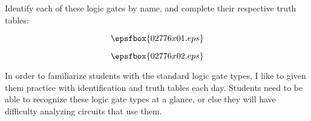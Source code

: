 

Identify each of these logic gates by name, and complete their respective truth tables:

$$\epsfbox{02776x01.eps}$$







$$\epsfbox{02776x02.eps}$$







In order to familiarize students with the standard logic gate types, I like to given them practice with identification and truth tables each day.  Students need to be able to recognize these logic gate types at a glance, or else they will have difficulty analyzing circuits that use them.




